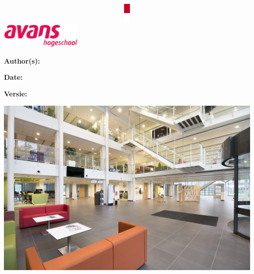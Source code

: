 
\begin{titlepage}
  \centering
  \includegraphics[width=1.00\textwidth,height=10.0mm]{images/avans-bar.png}
  \includegraphics[width=40.0mm,right]{images/avans-logo.png}

  \vfill

  \begin{flushleft}{\fontsize{13pt}{19.5pt}\selectfont\MakeUppercase{\textbf{\DepartmentName}}}\end{flushleft} 
  \begin{flushleft}{\fontsize{28pt}{42pt}\selectfont\color{avansred}\textbf{\ReportTitle}}\end{flushleft}
  \begin{flushleft}{\fontsize{14pt}{21pt}\selectfont\textbf{\CourseCode}}\end{flushleft}

  \vfill

  \begin{flushleft}{\textbf{Author(s):} \AuthorName}\\[4pt]\end{flushleft}
  \begin{flushleft}{\textbf{Date:} \DateofIssue}\end{flushleft}
  \begin{flushleft}{\textbf{Versie:} \Version}\\[4pt]\end{flushleft}

  \vfill

  \includegraphics[width=1.00\textwidth]{images/avans-foto.jpg}

\end{titlepage}

